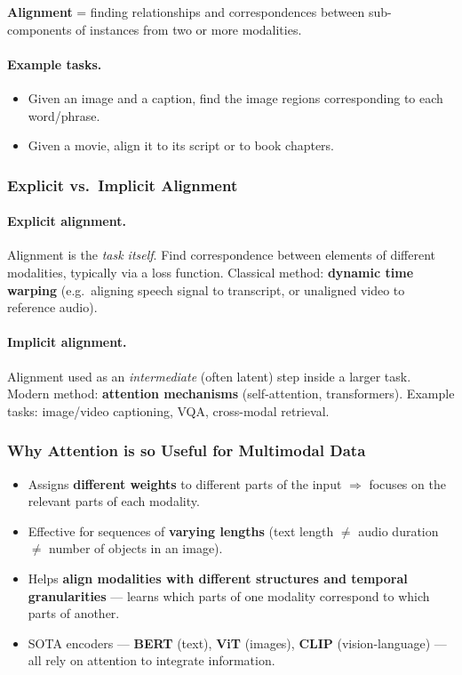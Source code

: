 \documentclass[11pt,a4paper]{article}
\theoremstyle{definition}
\theoremstyle{plain}
\theoremstyle{remark}
\begin{document}
\textbf{Alignment} = finding relationships and correspondences between sub-components of instances from two or more modalities.

\paragraph{Example tasks.}
\begin{itemize}
    \item Given an image and a caption, find the image regions corresponding to each word/phrase.
    \item Given a movie, align it to its script or to book chapters.
\end{itemize}

\subsubsection{Explicit vs.\ Implicit Alignment}

\paragraph{Explicit alignment.} Alignment is the \emph{task itself}. Find correspondence between elements of different modalities, typically via a loss function. Classical method: \textbf{dynamic time warping} (e.g.\ aligning speech signal to transcript, or unaligned video to reference audio).

\paragraph{Implicit alignment.} Alignment used as an \emph{intermediate} (often latent) step inside a larger task. Modern method: \textbf{attention mechanisms} (self-attention, transformers). Example tasks: image/video captioning, VQA, cross-modal retrieval.

\subsubsection{Why Attention is so Useful for Multimodal Data}

\begin{itemize}
    \item Assigns \textbf{different weights} to different parts of the input $\Rightarrow$ focuses on the relevant parts of each modality.
    \item Effective for sequences of \textbf{varying lengths} (text length $\neq$ audio duration $\neq$ number of objects in an image).
    \item Helps \textbf{align modalities with different structures and temporal granularities} --- learns which parts of one modality correspond to which parts of another.
    \item SOTA encoders --- \textbf{BERT} (text), \textbf{ViT} (images), \textbf{CLIP} (vision-language) --- all rely on attention to integrate information.
\end{itemize}
\end{document}
